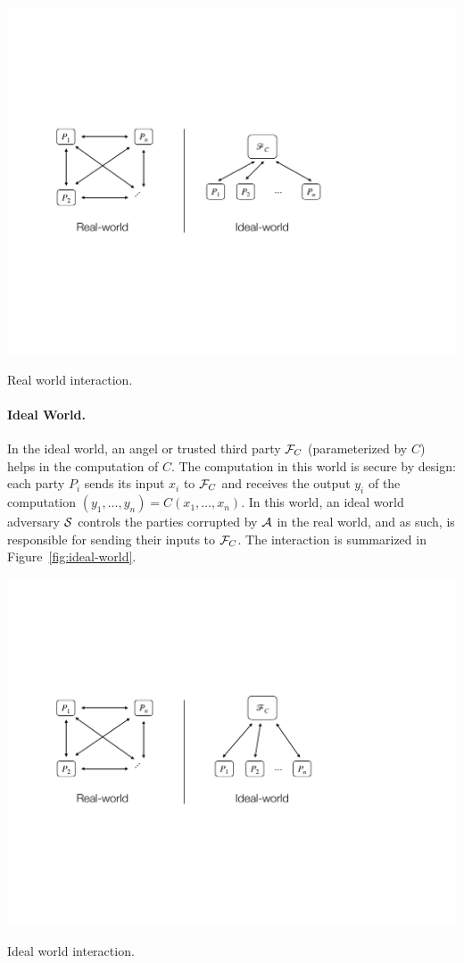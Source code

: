 \begin{marginfigure}
  \centering
  \includegraphics[width=\textwidth]{figures/real-world.pdf}
  \caption{Real world interaction.} \label{fig:real-world} 
\end{marginfigure}

\paragraph{Ideal World.} In the ideal world, an angel or trusted third party $\mathcal{F}_{C}$ (parameterized by $C$) helps in the computation of $C$.
The computation in this world is secure by design:
each party $P_i$ sends its input $x_i$ to $\mathcal{F}_C$ and receives the output $y_i$ of the computation $(y_1, \ldots, y_n) = C(x_1, \dotsc, x_n)$.
In this world, an ideal world adversary $\mathcal{S}$ controls the parties corrupted by $\mathcal{A}$ in the real world, and as such, is responsible for sending their inputs to $\mathcal{F}_C$.
The interaction is summarized in Figure~\ref{fig:ideal-world}.
\begin{marginfigure}
  \centering
  \includegraphics[width=\textwidth]{figures/ideal-world.pdf}
  \caption{Ideal world interaction.} \label{fig:ideal-world} 
\end{marginfigure}


